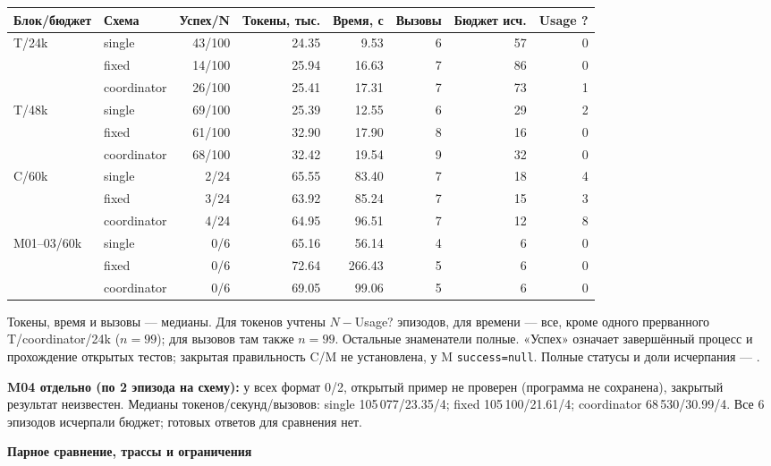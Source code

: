 \documentclass[10pt,a4paper]{article}
\newcommand{\id}[1]{{\fontsize{8}{10}\selectfont\texttt{\detokenize{#1}}}}
\begin{document}
\begin{center}\fontsize{8.6}{10.5}\selectfont
\begin{tabular}{llrrrrrr}
\toprule
Блок/бюджет & Схема & Успех/N & Токены, тыс. & Время, с & Вызовы & Бюджет исч. & Usage ?\\
\midrule
T/24k & single & 43/100 & 24.35 & 9.53 & 6 & 57 & 0\\
 & fixed & 14/100 & 25.94 & 16.63 & 7 & 86 & 0\\
 & coordinator & 26/100 & 25.41 & 17.31 & 7 & 73 & 1\\
T/48k & single & 69/100 & 25.39 & 12.55 & 6 & 29 & 2\\
 & fixed & 61/100 & 32.90 & 17.90 & 8 & 16 & 0\\
 & coordinator & 68/100 & 32.42 & 19.54 & 9 & 32 & 0\\
\midrule
C/60k & single & 2/24 & 65.55 & 83.40 & 7 & 18 & 4\\
 & fixed & 3/24 & 63.92 & 85.24 & 7 & 15 & 3\\
 & coordinator & 4/24 & 64.95 & 96.51 & 7 & 12 & 8\\
\midrule
M01--03/60k & single & 0/6 & 65.16 & 56.14 & 4 & 6 & 0\\
 & fixed & 0/6 & 72.64 & 266.43 & 5 & 6 & 0\\
 & coordinator & 0/6 & 69.05 & 99.06 & 5 & 6 & 0\\
\bottomrule
\end{tabular}
\end{center}
{\footnotesize Токены, время и вызовы --- медианы. Для токенов учтены $N-$Usage?
эпизодов, для времени --- все, кроме одного прерванного T/coordinator/24k
($n=99$); для вызовов там также $n=99$. Остальные знаменатели полные.
«Успех» означает завершённый процесс и прохождение открытых тестов;
закрытая правильность C/M не установлена, у M \texttt{success=null}.
Полные статусы и доли исчерпания --- \id{analysis/final/summary.csv}.}

\textbf{M04 отдельно (по 2 эпизода на схему):} у всех формат 0/2, открытый пример
не проверен (программа не сохранена), закрытый результат неизвестен.
Медианы токенов/секунд/вызовов: single 105\,077/23.35/4;
fixed 105\,100/21.61/4; coordinator 68\,530/30.99/4.
Все 6 эпизодов исчерпали бюджет; готовых ответов для сравнения нет.

\newpage
{\sffamily\bfseries\large Парное сравнение, трассы и ограничения}
\end{document}

